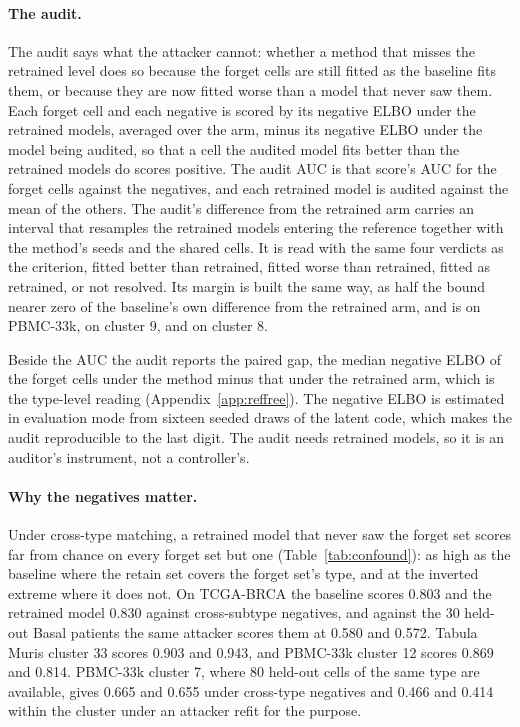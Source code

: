 \documentclass{article}
\begin{document}
\paragraph{The audit.} The audit says what the attacker cannot: whether a method that misses the retrained level does so because the forget cells are still fitted as the baseline fits them, or because they are now fitted worse than a model that never saw them. Each forget cell and each negative is scored by its negative ELBO under the retrained models, averaged over the arm, minus its negative ELBO under the model being audited, so that a cell the audited model fits better than the retrained models do scores positive. The audit AUC is that score's AUC for the forget cells against the negatives, and each retrained model is audited against the mean of the others. The audit's difference from the retrained arm carries an interval that resamples the retrained models entering the reference together with the method's seeds and the shared cells. It is read with the same four verdicts as the criterion, fitted better than retrained, fitted worse than retrained, fitted as retrained, or not resolved. Its margin is built the same way, as half the bound nearer zero of the baseline's own difference from the retrained arm, and is  on PBMC-33k,  on cluster 9, and  on cluster 8.

Beside the AUC the audit reports the paired gap, the median negative ELBO of the forget cells under the method minus that under the retrained arm, which is the type-level reading (Appendix~\ref{app:reffree}). The negative ELBO is estimated in evaluation mode from sixteen seeded draws of the latent code, which makes the audit reproducible to the last digit. The audit needs retrained models, so it is an auditor's instrument, not a controller's.

\paragraph{Why the negatives matter.}
\label{sec:confound}
Under cross-type matching, a retrained model that never saw the forget set scores far from chance on every forget set but one (Table~\ref{tab:confound}): as high as the baseline where the retain set covers the forget set's type, and at the inverted extreme where it does not. On TCGA-BRCA the baseline scores 0.803 and the retrained model 0.830 against cross-subtype negatives, and against the 30 held-out Basal patients the same attacker scores them at 0.580 and 0.572. Tabula Muris cluster 33 scores 0.903 and 0.943, and PBMC-33k cluster 12 scores 0.869 and 0.814. PBMC-33k cluster 7, where 80 held-out cells of the same type are available, gives 0.665 and 0.655 under cross-type negatives and 0.466 and 0.414 within the cluster under an attacker refit for the purpose. 
\end{document}

